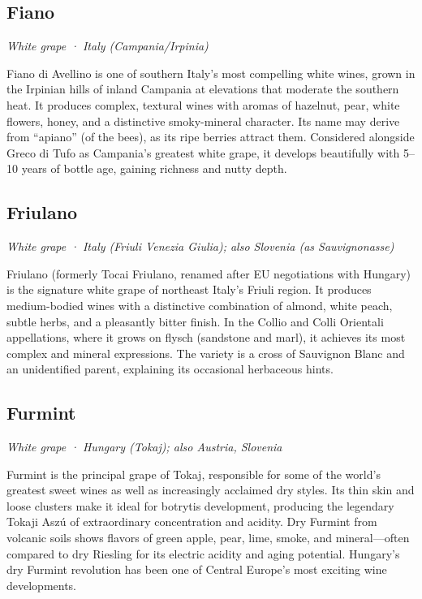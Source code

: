 \subsection*{Fiano}
\textit{White grape · Italy (Campania/Irpinia)}\par\smallskip

Fiano di Avellino is one of southern Italy’s most compelling white wines, grown in the Irpinian hills of inland Campania at elevations that moderate the southern heat. It produces complex, textural wines with aromas of hazelnut, pear, white flowers, honey, and a distinctive smoky-mineral character. Its name may derive from “apiano” (of the bees), as its ripe berries attract them. Considered alongside Greco di Tufo as Campania’s greatest white grape, it develops beautifully with 5–10 years of bottle age, gaining richness and nutty depth.

\subsection*{Friulano}
\textit{White grape · Italy (Friuli Venezia Giulia); also Slovenia (as Sauvignonasse)}\par\smallskip

Friulano (formerly Tocai Friulano, renamed after EU negotiations with Hungary) is the signature white grape of northeast Italy’s Friuli region. It produces medium-bodied wines with a distinctive combination of almond, white peach, subtle herbs, and a pleasantly bitter finish. In the Collio and Colli Orientali appellations, where it grows on flysch (sandstone and marl), it achieves its most complex and mineral expressions. The variety is a cross of Sauvignon Blanc and an unidentified parent, explaining its occasional herbaceous hints.

\subsection*{Furmint}
\textit{White grape · Hungary (Tokaj); also Austria, Slovenia}\par\smallskip

Furmint is the principal grape of Tokaj, responsible for some of the world’s greatest sweet wines as well as increasingly acclaimed dry styles. Its thin skin and loose clusters make it ideal for botrytis development, producing the legendary Tokaji Aszú of extraordinary concentration and acidity. Dry Furmint from volcanic soils shows flavors of green apple, pear, lime, smoke, and mineral—often compared to dry Riesling for its electric acidity and aging potential. Hungary’s dry Furmint revolution has been one of Central Europe’s most exciting wine developments.

